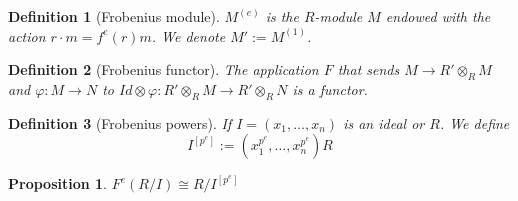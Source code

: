 \documentclass[leqno]{article}
\newtheorem{proposition}{Proposition}
\newtheorem{definition}{Definition}
\begin{document}
\begin{definition}[Frobenius module] $M^{(e)}$ is the $R$-module $M$ endowed with the action  $r\cdot m= f^{e}(r)m$. We denote $M':=M^{(1)}$.
\end{definition}

\begin{definition}[Frobenius functor] The application $F$ that sends $M\to R'\otimes _RM$ and $\varphi :M\to N$ to $Id\otimes \varphi : R'\otimes _R M \to R'\otimes _RN $ is a functor.
\end{definition}

\begin{definition}[Frobenius powers] If $I=(x_1, \ldots, x_n)$ is an ideal or $R$. We define
   \[
	 I^{[p^e]}:= (x_1^{p^e}, \ldots, x_n^{p^e})R
  \] 
\end{definition}

\begin{proposition} $F^e(R / I)\cong  R / I^{[p^e]}$ 
\end{proposition}
\end{document}
